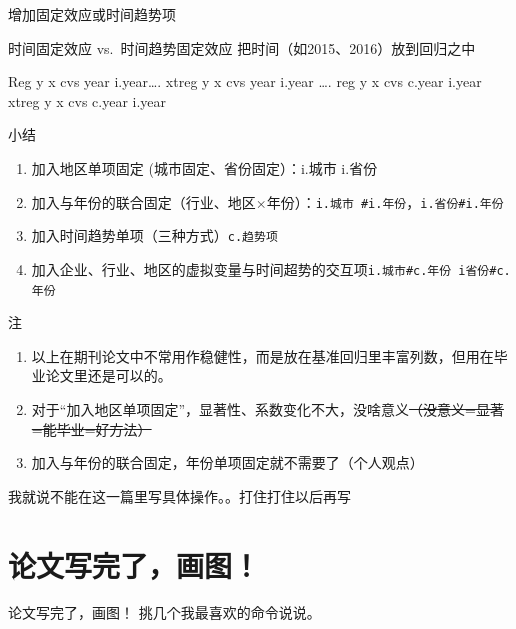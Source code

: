 \documentclass[
  ignorenonframetext,
  aspectratio=169,
  fontset=ubuntu]{ctexbeamer}
\providecommand{\tightlist}{%
  \setlength{\itemsep}{0pt}\setlength{\parskip}{0pt}}
\providecommand{\st}[1]{\CJKsout{#1}}
\renewcommand{\st}[1]{\sout{#1}}
\begin{document}
\begin{frame}[fragile]{增加固定效应或时间趋势项}
\begin{block}{时间固定效应 vs.~时间趋势固定效应}
把时间（如2015、2016）放到回归之中

Reg y x cvs year i.year\ldots. xtreg y x cvs year i.year \ldots. reg y x
cvs c.year i.year xtreg y x cvs c.year i.year
\end{block}

\begin{block}{小结}
\label{ux5c0fux7ed3}
\begin{enumerate}
\tightlist
\item
  加入地区单项固定 (城市固定、省份固定）：i.城市 i.省份
\item
  加入与年份的联合固定（行业、地区×年份）：\texttt{i.城市 #i.年份}，\texttt{i.省份#i.年份}
\item
  加入时间趋势单项（三种方式）\texttt{c.趋势项}
\item
  加入企业、行业、地区的虚拟变量与时间超势的交互项\texttt{i.城市#c.年份  i省份#c.年份}
\end{enumerate}
\end{block}

\begin{block}{注}
\label{ux6ce8}
\begin{enumerate}
\tightlist
\item
  以上在期刊论文中不常用作稳健性，而是放在基准回归里丰富列数，但用在毕业论文里还是可以的。
\item
  对于``加入地区单项固定''，显著性、系数变化不大，没啥意义\st{（没意义=显著=能毕业=好方法）}
\item
  加入与年份的联合固定，年份单项固定就不需要了（个人观点）
\end{enumerate}

我就说不能在这一篇里写具体操作。。打住打住以后再写
\end{block}
\end{frame}

\section{论文写完了，画图！}\label{ux8bbaux6587ux5199ux5b8cux4e86ux753bux56fe}

\begin{frame}[fragile]{论文写完了，画图！}
挑几个我最喜欢的命令说说。
\end{frame}
\end{document}

